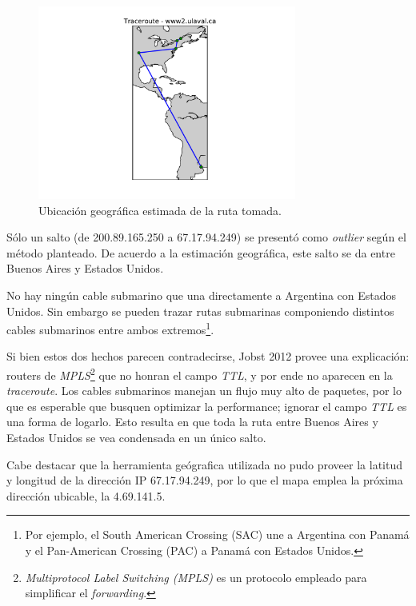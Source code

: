 \begin{figure}[H]
    \centering
    \includegraphics[width=8.5cm]{img/grafico3-www2-ulaval-ca.pdf}
    \caption{\normalfont Ubicación geográfica estimada de la ruta tomada.}
    \label{mapaLaval}
\end{figure}

\par Sólo un salto (de 200.89.165.250 a 67.17.94.249) se presentó como \textit{outlier} según el método planteado\cite{outliers}.
De acuerdo a la estimación geográfica, este salto se da entre Buenos Aires y Estados Unidos.

\par No hay ningún cable submarino que una directamente a Argentina con Estados Unidos.
Sin embargo se pueden trazar rutas submarinas componiendo distintos cables submarinos entre ambos extremos\footnote{Por ejemplo, el South American Crossing (SAC) une a Argentina con Panamá y el Pan-American Crossing (PAC) a Panamá con Estados Unidos.}.

\par Si bien estos dos hechos parecen contradecirse, Jobst 2012\cite{anomalias} provee una explicación: routers de \textit{MPLS}\footnote{\textit{Multiprotocol Label Switching (MPLS)} es un protocolo empleado para simplificar el \textit{forwarding}.} que no honran el campo \textit{TTL}, y por ende no aparecen en la \textit{traceroute}.
Los cables submarinos manejan un flujo muy alto de paquetes, por lo que es esperable que busquen optimizar la performance; ignorar el campo \textit{TTL} es una forma de logarlo.
Esto resulta en que toda la ruta entre Buenos Aires y Estados Unidos se vea condensada en un único salto.

\par Cabe destacar que la herramienta geógrafica utilizada no pudo proveer la latitud y longitud de la dirección IP 67.17.94.249, por lo que el mapa emplea la próxima dirección ubicable, la 4.69.141.5.
